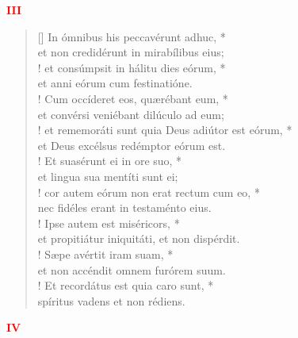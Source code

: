 \begin{center}
\textcolor{red}{\large \bf III}\\
\end{center}
\begin{verse}[\versewidth]
In ómnibus his peccavérunt adhuc, *\\
et non credidérunt in mirabílibus eius;\\!
\vin et consúmpsit in hálitu dies eórum, *\\
\vin et anni eórum cum festinatióne.\\!
Cum occíderet eos, quærébant eum, *\\
et convérsi veniébant dilúculo ad eum;\\!
\vin et rememoráti sunt quia Deus adiútor est eórum, *\\
\vin et Deus excélsus redémptor eórum est.\\!
Et suasérunt ei in ore suo, *\\
et lingua sua mentíti sunt ei;\\!
\vin cor autem eórum non erat rectum cum eo, *\\
\vin nec fidéles erant in testaménto eius.\\!
Ipse autem est miséricors, *\\
et propitiátur iniquitáti, et non dispérdit.\\!
\vin Sæpe avértit iram suam, *\\
\vin et non accéndit omnem furórem suum.\\!
Et recordátus est quia caro sunt, *\\
spíritus vadens et non rédiens.\\
\end{verse}
\begin{center}
\textcolor{red}{\large \bf IV}\\
\end{center}
